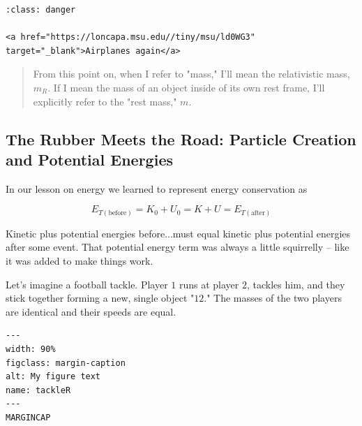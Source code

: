 \documentclass[
]{article}
\begin{document}
\begin{verbatim}
:class: danger

<a href="https://loncapa.msu.edu//tiny/msu/ld0WG3"  target="_blank">Airplanes again</a>
\end{verbatim}

\begin{quote}
From this point on, when I refer to "mass," I'll mean the relativistic
mass, \(m_R\). If I mean the mass of an object inside of its own rest
frame, I'll explicitly refer to the "rest mass," \(m\).
\end{quote}

\hypertarget{the-rubber-meets-the-road-particle-creation-and-potential-energies}{%
\subsection{The Rubber Meets the Road: Particle Creation and Potential
Energies}\label{the-rubber-meets-the-road-particle-creation-and-potential-energies}}

In our lesson on energy we learned to represent energy conservation as

\[E_{T (\text{before})}=K_0 + U_0 = K + U = E_{T (\text{after})}\nonumber\]

Kinetic plus potential energies before...must equal kinetic plus
potential energies after some event. That potential energy term was
always a little squirrelly -- like it was added to make things work.

Let's imagine a football tackle. Player \(1\) runs at player \(2\),
tackles him, and they stick together forming a new, single object
"\(12\)." The masses of the two players are identical and their speeds
are equal.

\begin{verbatim}
---
width: 90%
figclass: margin-caption
alt: My figure text
name: tackleR
---
MARGINCAP
\end{verbatim}
\end{document}
